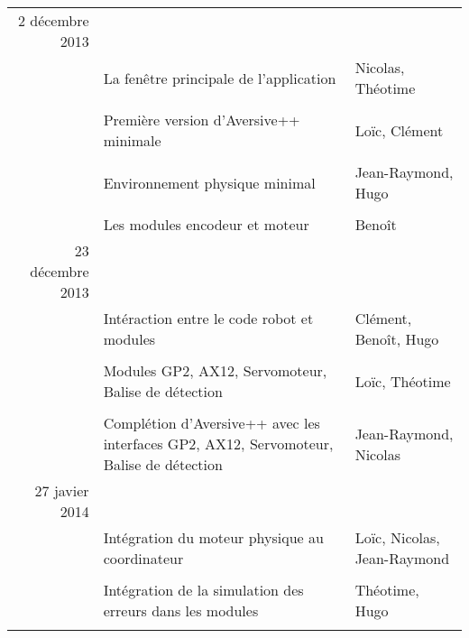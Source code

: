 \begin{tabular}{rp{8cm}|p{3cm}}

    2 décembre 2013 &&\\
    
    &
    La fenêtre principale de l'application &
    Nicolas, Théotime \\
    
    &&\\
    
    &
    Première version d'Aversive++ minimale &
    Loïc, Clément \\
    
    &&\\
    
    &
    Environnement physique minimal &
    Jean-Raymond, Hugo \\
    
    &&\\
    
    &
    Les modules encodeur et moteur &
    Benoît \\
    
    23 décembre 2013 &&\\
    
    &
    Intéraction entre le code robot et modules &
    Clément, Benoît, Hugo \\
    
    &&\\
    
    &
    Modules GP2, AX12, Servomoteur, Balise de détection &
    Loïc, Théotime \\
    
    &&\\
    
    &
    Complétion d'Aversive++ avec les interfaces GP2, AX12, Servomoteur, Balise de détection &
    Jean-Raymond, Nicolas\\

    27 javier 2014 &&\\

    &
    Intégration du moteur physique au coordinateur &
    Loïc, Nicolas, Jean-Raymond \\
    
    &&\\
    
    &
    Intégration de la simulation des erreurs dans les modules &
    Théotime, Hugo \\
    
    &&\\
    

\end{tabular}

